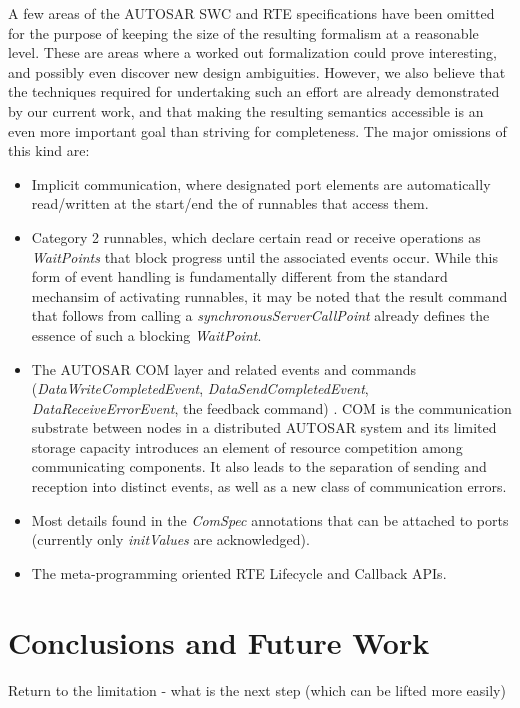 \documentclass[twocolumn]{article}
\begin{document}
A few areas of the AUTOSAR SWC and RTE specifications have been omitted for the purpose of keeping the size of the resulting formalism at a reasonable level. These are areas where a worked out formalization could prove interesting, and possibly even discover new design ambiguities. However, we also believe that the techniques required for undertaking such an effort are already demonstrated by our current work, and that making the resulting semantics accessible is an even more important goal than striving for completeness. The major omissions of this kind are:
\begin{itemize}
\item Implicit communication, where designated port elements are automatically read/written at the start/end the of runnables that access them.
\item Category 2 runnables, which declare certain read or receive operations as \emph{WaitPoints} that block progress until the associated events occur. While this form of event handling is fundamentally different from the standard mechansim of activating runnables, it may be noted that the result command that follows from calling a \emph{synchronousServerCallPoint} already defines the essence of such a blocking \emph{WaitPoint}.
\item The AUTOSAR COM layer and related events and commands (\emph{DataWriteCompletedEvent}, \emph{DataSendCompletedEvent}, \emph{DataReceiveErrorEvent}, the feedback command) \cite{AR:COM}. COM is the communication substrate between nodes in a distributed AUTOSAR system and its limited storage capacity introduces an element of resource competition among communicating components. It also leads to the separation of sending and reception into distinct events, as well as a new class of communication errors.
\item Most details found in the \emph{ComSpec} annotations that can be attached to ports (currently only \emph{initValues} are acknowledged).
\item The meta-programming oriented RTE Lifecycle and Callback APIs.
\end{itemize}


\section{Conclusions and Future Work}
\label{sec:Conc}

Return to the limitation - what is the next step (which can be lifted more easily)


\end{document}
